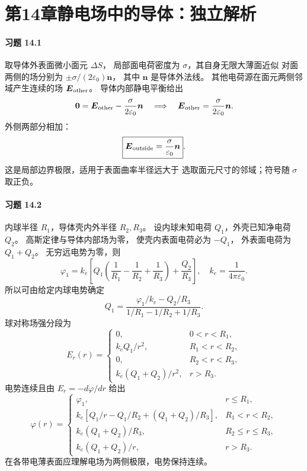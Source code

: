 \section*{第14章\quad 静电场中的导体：独立解析}

\paragraph{习题 14.1}
取导体外表面微小面元 \(\Delta S\)，
局部面电荷密度为 \(\sigma\)，其自身无限大薄面近似
对面两侧的场分别为
\(\pm\sigma/(2\varepsilon_0)\boldsymbol n\)，
其中 \(\boldsymbol n\) 是导体外法线。
其他电荷源在面元两侧邻域产生连续的场
\(\boldsymbol E_{\rm other}\)。
导体内部静电平衡给出
\[
 \boldsymbol 0=\boldsymbol E_{\rm other}
 -\frac{\sigma}{2\varepsilon_0}\boldsymbol n
 \quad\Longrightarrow\quad
 \boldsymbol E_{\rm other}
 =\frac{\sigma}{2\varepsilon_0}\boldsymbol n.
\]
外侧两部分相加：
\[
 \boxed{\boldsymbol E_{\rm outside}
 =\frac{\sigma}{\varepsilon_0}\boldsymbol n}.
\]
这是局部边界极限，适用于表面曲率半径远大于
选取面元尺寸的邻域；符号随 \(\sigma\) 取正负。

\paragraph{习题 14.2}
内球半径 \(R_1\)，导体壳内外半径 \(R_2,R_3\)。
设内球未知电荷 \(Q_1\)，外壳已知净电荷 \(Q_2\)。
高斯定律与导体内部场为零，
使壳内表面电荷必为 \(-Q_1\)，
外表面电荷为 \(Q_1+Q_2\)。
无穷远电势为零，则
\[
 \varphi_1=k_e\left[
 Q_1\left(\frac1{R_1}-\frac1{R_2}+\frac1{R_3}\right)
 +\frac{Q_2}{R_3}\right],\quad
 k_e=\frac1{4\pi\varepsilon_0}.
\]
所以可由给定内球电势确定
\[
 \boxed{Q_1=
 \frac{\varphi_1/k_e-Q_2/R_3}
 {1/R_1-1/R_2+1/R_3}}.
\]
球对称场强分段为
\[
 \boxed{E_r(r)=
 \begin{cases}
 0,&0<r<R_1,\\
 k_eQ_1/r^2,&R_1<r<R_2,\\
 0,&R_2<r<R_3,\\
 k_e(Q_1+Q_2)/r^2,&r>R_3.
 \end{cases}}
\]
电势连续且由 \(E_r=-d\varphi/dr\) 给出
\[
 \boxed{\varphi(r)=
 \begin{cases}
 \varphi_1,&r\le R_1,\\
 k_e[Q_1/r-Q_1/R_2+(Q_1+Q_2)/R_3],
   &R_1<r<R_2,\\
 k_e(Q_1+Q_2)/R_3,&R_2\le r\le R_3,\\
 k_e(Q_1+Q_2)/r,&r>R_3.
 \end{cases}}
\]
在各带电薄表面应理解电场为两侧极限，电势保持连续。


